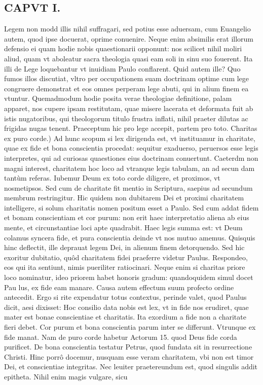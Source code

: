 \documentclass{article}
\begin{document}
\begin{pages}
\section*{CAPVT I. }
\marginpar{[ p.5 ]}\pstart Legem non modd illis nihil suffragari, sed potius esse aduersam, cum Euangelio autem, quod ipse docuerat, oprime conuenire. Neque enim absimilis erat illorum defensio ei quam hodie nobis quaestionarii opponunt: nos scilicet nihil moliri aliud, quam vt aboleatur sacra theologia quasi eam soli in sinu suo fouerent. Ita illi de Lege loquebantur vt inuidiam Paulo conflarent. Quid autem ille? Quo fumos illos discutiat, vltro per occupationem suam doctrinam optime cum lege congruere demonstrat et eos omnes perperam lege abuti, qui in alium finem ea vtuntur. Quemadmodum hodie posita verae theologiae definitione, palam apparet, nos cupere ipsam restitutam, quae misere lacerata et deformata fuit ab istis nugatoribus, qui theologorum titulo frustra inflati, nihil praeter dilutas ac frigidas nugas tenent. Praeceptum hic pro lege accepit, partem pro toto.  \pend\pstart Charitas ex puro corde.) Ad hunc scopum si lex dirigenda est, vt instituamur in charitate, quae ex fide et bona conscientia procedat: sequitur exaduerso, peruersos esse legis interpretes, qui ad curiosas quaestiones eius doctrinam conuertunt. Caeterdm non magni interest, charitatem hoc loco ad vtranque legis tabulam, an ad secun dam tantùm referas. Iubemur Deum ex toto corde diligere, et proximos, vt nosmetipsos. Sed cum de charitate fit mentio in Scriptura, saepius ad secundum membrum restringitur. Hic quidem non dubitarem Dei et proximi charitatem intelligere, si solum charitatis nomen positum esset a Paulo. Sed cum addat fidem et bonam conscientiam et cor purum: non erit haec interpretatio aliena ab eius mente, et circunstantiae loci apte quadrabit. Haec legis summa est: vt Deum colamus syncera fide, et pura conscientia deinde vt nos mutuo amemus. Quisquis hinc deflectit, ille deprauat legem Dei, in alienum finem detorquendo. Sed hic exoritur dubitatio, quôd charitatem fidei praeferre videtur Paulus. Respondeo, eos qui ita sentiunt, nimis pueriliter ratiocinari. Neque enim si charitas priore loco nominatur, ideo priorem habet honoris gradum: quandoquidem simul docet Pau lus, ex fide eam manare. Causa autem effectum suum profecto ordine antecedit. Ergo si rite expendatur totus contextus, perinde valet, quod Paulus dicit, aesi dixisset: Hoc consilio data nobis est lex, vt in fide nos erudiret, quae mater est bonae conscientiae et charitatis. Ita exordium a fide non a charitate fieri debet. Cor purum et bona conscientia parum inter se differunt. Vtrunque ex fide manat. Nam de puro corde habetur Actorum 15. quod Deus fide corda purificet. De bona conscientia testatur Petrus, quod fundata sit in resurrectione Christi. Hinc porrô docemur, nusquam esse veram charitatem, vbi non est timor Dei, et conscientiae integritas. Nec leuiter praetereundum est, quod singulis addit epitheta. Nihil enim magis vulgare, sicu  \pend

\end{pages}
\end{document}
